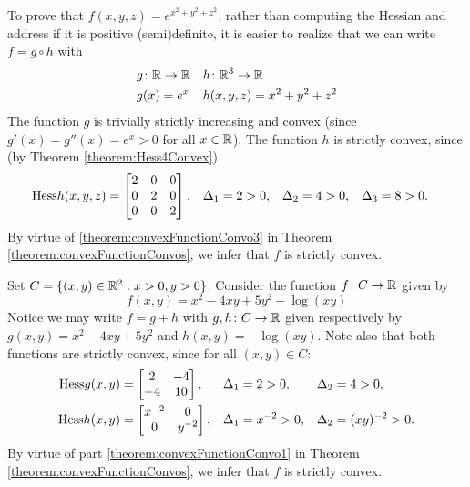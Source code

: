\begin{example}
To prove that $f(x,y,z) = e^{x^2+y^2+z^2}$, rather than computing the Hessian and address if it is positive (semi)definite, it is easier to realize that we can write $f = g\circ h$ with 
\begin{align*}
&g \colon \mathbb{R} \to \mathbb{R} && h \colon \mathbb{R}^3 \to \mathbb{R} \\
& g(x) = e^x && h(x,y,z)=x^2+y^2+z^2
\end{align*}
The function $g$ is trivially strictly increasing and convex (since $g'(x) = g''(x) = e^x > 0$ for all $x \in \mathbb{R}$).  The function $h$ is strictly convex, since (by Theorem \ref{theorem:Hess4Convex})
\begin{align*}
\mathop{\mathrm{Hess}{h}}(x,y,z) &= \begin{bmatrix} 2 & 0 & 0 \\ 0 & 2 & 0 \\ 0 & 0 & 2 \end{bmatrix}, &\Delta_1 &=2 >0, &\Delta_2 &=4 >0, &\Delta_3 &=8 > 0.
\end{align*}
By virtue of \ref{theorem:convexFunctionConvo3} in Theorem \ref{theorem:convexFunctionConvos}, we infer that $f$ is strictly convex.
\end{example}

\begin{example}
Set $C = \{ (x,y) \in \mathbb{R}^2 : x>0, y>0 \}$.  Consider the function $f\colon C \to \mathbb{R}$ given by
\begin{equation*}
f(x,y) = x^2 -4xy+5y^2 - \log (xy)
\end{equation*}
Notice we may write $f = g+h$ with $g,h \colon C \to \mathbb{R}$ given respectively by $g(x,y) = x^2 -4xy+5y^2$ and $h(x,y) = -\log(xy)$.  Note also that both functions are strictly convex, since for all $(x,y) \in C$:
\begin{align*}
\mathop{\mathrm{Hess}{g}}(x,y) &= \begin{bmatrix} 2 & -4 \\ -4 & 10 \end{bmatrix}, &\Delta_1 &= 2 >0, & \Delta_2 &=4 >0, \\
\mathop{\mathrm{Hess}{h}}(x,y) &= \begin{bmatrix} x^{-2} & 0 \\ 0 & y^{-2} \end{bmatrix}, &\Delta_1 &= x^{-2} >0, &\Delta_2 &=(xy)^{-2} >0. 
\end{align*}
By virtue of part \ref{theorem:convexFunctionConvo1} in Theorem \ref{theorem:convexFunctionConvos}, we infer that $f$ is strictly convex.
\end{example}

